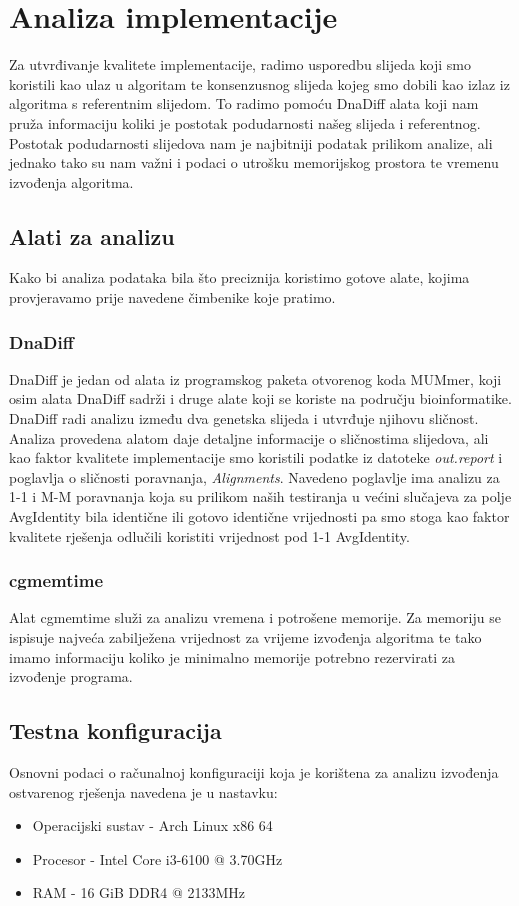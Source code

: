 \documentclass[times, utf8, seminar, numeric]{fer}
\begin{document}
\chapter{Analiza implementacije}
Za utvrđivanje kvalitete implementacije, radimo usporedbu slijeda koji smo koristili kao ulaz u algoritam te konsenzusnog slijeda kojeg smo dobili kao izlaz iz algoritma s referentnim slijedom. To radimo pomoću DnaDiff \cite{MUMMER} alata koji nam pruža informaciju koliki je postotak podudarnosti našeg slijeda i referentnog. Postotak podudarnosti slijedova nam je najbitniji podatak prilikom analize, ali jednako tako su nam važni i podaci o utrošku memorijskog prostora te vremenu izvođenja algoritma.

\section{Alati za analizu}
Kako bi analiza podataka bila što preciznija koristimo gotove alate, kojima provjeravamo prije navedene čimbenike koje pratimo.

\subsection{DnaDiff}
DnaDiff \cite{MUMMER} je jedan od alata iz programskog paketa otvorenog koda MUMmer, koji osim alata DnaDiff sadrži i druge alate koji se koriste na području bioinformatike. DnaDiff radi analizu između dva genetska slijeda i utvrđuje njihovu sličnost. Analiza provedena alatom daje detaljne informacije o sličnostima slijedova, ali kao faktor kvalitete implementacije smo koristili podatke iz datoteke \emph{out.report} i poglavlja o sličnosti poravnanja, \emph{Alignments}. Navedeno poglavlje ima analizu za 1-1 i M-M poravnanja koja su prilikom naših testiranja u većini slučajeva za polje AvgIdentity bila identične ili gotovo identične vrijednosti pa smo stoga kao faktor kvalitete rješenja odlučili koristiti vrijednost pod 1-1 AvgIdentity.

\subsection{cgmemtime}
Alat cgmemtime \cite{cgmemtime} služi za analizu vremena i potrošene memorije. Za memoriju se ispisuje najveća zabilježena vrijednost za vrijeme izvođenja algoritma te tako imamo informaciju koliko je minimalno memorije potrebno rezervirati za izvođenje programa.


\section{Testna konfiguracija}
Osnovni podaci o računalnoj konfiguraciji koja je korištena za analizu izvođenja ostvarenog rješenja navedena je u nastavku:
\renewcommand{\labelitemi}{$\bullet$}
\begin{itemize}
	\item Operacijski sustav - Arch Linux x86 64
	\item Procesor - Intel Core i3-6100 @ 3.70GHz
	\item RAM - 16 GiB DDR4 @ 2133MHz
\end{itemize}
\end{document}

